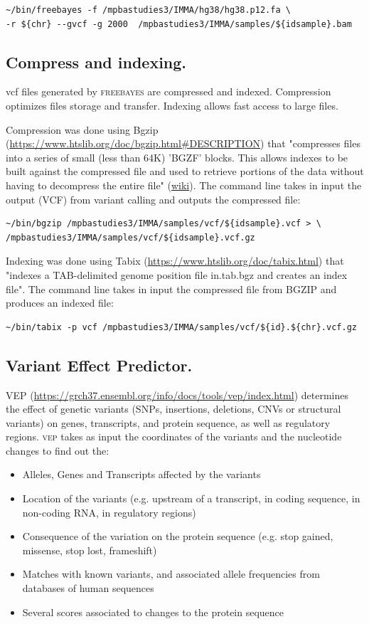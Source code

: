 \begin{verbatim}
~/bin/freebayes -f /mpbastudies3/IMMA/hg38/hg38.p12.fa \ 
-r ${chr} --gvcf -g 2000  /mpbastudies3/IMMA/samples/${idsample}.bam 
\end{verbatim}

\subsection {Compress and indexing.} 
vcf files generated by \textsc{freebayes} are compressed and indexed. Compression optimizes files storage and transfer. Indexing allows fast access to large files. 

Compression was done using Bgzip (\url{https://www.htslib.org/doc/bgzip.html#DESCRIPTION}) that "compresses files into a series of small (less than 64K) 'BGZF' blocks. This allows indexes to be built against the compressed file and used to retrieve portions of the data without having to decompress the entire file" (\href{https://www.htslib.org/doc/bgzip.html#DESCRIPTION}{wiki}).
The command line takes in input the output (VCF) from variant calling and outputs the compressed file: 

\begin{verbatim}
~/bin/bgzip /mpbastudies3/IMMA/samples/vcf/${idsample}.vcf > \
/mpbastudies3/IMMA/samples/vcf/${idsample}.vcf.gz
\end{verbatim}

Indexing was done using Tabix (\url{https://www.htslib.org/doc/tabix.html}) that "indexes a TAB-delimited genome position file in.tab.bgz and creates an index file". The command line takes in input the compressed file from BGZIP and produces an indexed file: 

\begin{verbatim}
~/bin/tabix -p vcf /mpbastudies3/IMMA/samples/vcf/${id}.${chr}.vcf.gz 
\end{verbatim}


\subsection{Variant Effect Predictor.}  
VEP (\url{https://grch37.ensembl.org/info/docs/tools/vep/index.html}) determines the effect of genetic variants (SNPs, insertions, deletions, CNVs or structural variants) on genes, transcripts, and protein sequence, as well as regulatory regions. \textsc{vep} takes as input the coordinates of the variants and the nucleotide changes to find out the:
\begin{itemize}
    \item Alleles, Genes and Transcripts affected by the variants
    \item Location of the variants (e.g. upstream of a transcript, in coding sequence, in non-coding RNA, in regulatory regions)
    \item Consequence of the variation on the protein sequence (e.g. stop gained, missense, stop lost, frameshift)
    \item Matches with known variants, and associated  allele frequencies from databases of human sequences
    \item Several scores associated to changes to the protein sequence
\end{itemize}


